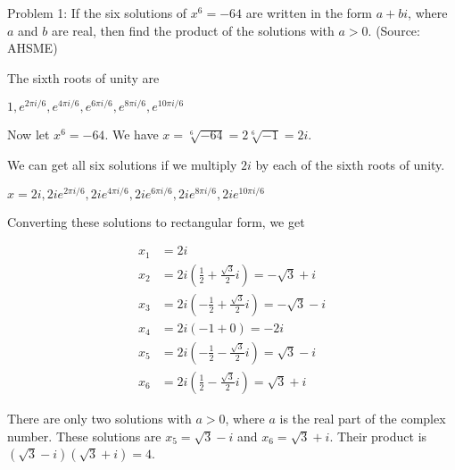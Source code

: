 Problem 1: If the six solutions of $x^6 = -64$ are written in the form $a + bi$, where $a$ and $b$ are real, then find the product of the solutions with $a > 0$. (Source: AHSME)

The sixth roots of unity are

$1, e^{2\pi i / 6}, e^{4 \pi i / 6}, e^{6 \pi i / 6}, e^{8 \pi i / 6}, e^{10 \pi i / 6}$

Now let $x^6 = -64$. We have $x = \sqrt[6]{-64} = 2\sqrt[6]{-1} = 2i$. 

We can get all six solutions if we multiply $2i$ by each of the sixth roots of unity.

$x = 2i, 2i e^{2\pi i / 6}, 2i e^{4 \pi i / 6}, 2i e^{6 \pi i / 6}, 2i e^{8 \pi i / 6}, 2i e^{10 \pi i / 6} $

Converting these solutions to rectangular form, we get

\begin{align*}
x_1 &= 2i \\
x_2 &= 2i(\frac{1}{2} + \frac{\sqrt 3}{2}i) = -\sqrt{3} + i \\
x_3 &= 2i(-\frac{1}{2} + \frac{\sqrt 3}{2}i) = -\sqrt{3} - i \\
x_4 &= 2i(-1 + 0) = -2i \\
x_5 &= 2i(-\frac{1}{2} - \frac{\sqrt 3}{2}i) = \sqrt{3} - i \\
x_6 &= 2i(\frac{1}{2} - \frac{\sqrt 3}{2}i) = \sqrt{3} + i
\end{align*}

There are only two solutions with $a > 0$, where $a$ is the real part of the complex number. These solutions are $x_5 = \sqrt{3} - i$ and $x_6 = \sqrt{3} + i$. Their product is $\boxed{(\sqrt{3} - i)(\sqrt{3} + i) = 4}$.
